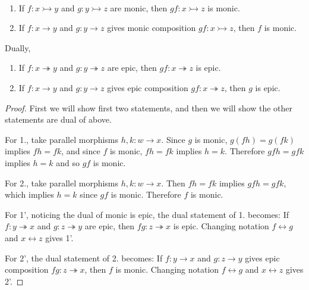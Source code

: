 \begin{lemma}
~\begin{enumerate}
\item If $f:x \rightarrowtail y$ and $g:y \rightarrowtail z$ are monic, then $gf:x\rightarrowtail z$ is monic.
\item If $f:x\rightarrow y$ and $g:y\rightarrow z$ gives monic composition $gf:x\rightarrowtail z$, then $f$ is monic.
\end{enumerate}
Dually,
\begin{enumerate}[label=\arabic*']
\item If $f:x\twoheadrightarrow y$ and $g:y\twoheadrightarrow z$ are epic, then $gf:x\twoheadrightarrow z$ is epic.
\item If $f:x\rightarrow y$ and $g:y\rightarrow z$ gives epic composition $gf:x\twoheadrightarrow z$, then $g$ is epic.
\end{enumerate}
\end{lemma}
\begin{proof}
First we will show first two statements, and then we will show the other statements are dual of above.

For 1., take parallel morphisms $h,k:w\rightarrow x$. Since $g$ is monic, $g(fh)=g(fk)$ implies $fh=fk$, and since $f$ is monic, $fh=fk$ implies $h=k$. Therefore $gfh=gfk$ implies $h=k$ and so $gf$ is monic.

For 2., take parallel morphisms $h,k:w\rightarrow x$. Then $fh=fk$ implies $gfh=gfk$, which implies $h=k$ since $gf$ is monic. Therefore $f$ is monic.

For 1', noticing the dual of monic is epic, the dual statement of 1. becomes: If $f:y\twoheadrightarrow x$ and $g:z\twoheadrightarrow y$ are epic, then $fg:z\twoheadrightarrow x$ is epic. Changing notation $f\leftrightarrow g$ and $x\leftrightarrow z$ gives 1'.

For 2', the dual statement of 2. becomes: If $f:y\rightarrow x$ and $g:z\rightarrow y$ gives epic composition $fg:z\twoheadrightarrow x$, then $f$ is monic. Changing notation $f\leftrightarrow g$ and $x\leftrightarrow z$ gives 2'.
\end{proof}

